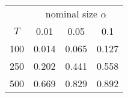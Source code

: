 % 
\begin{tabular}{cccc}
  \hline
  & \multicolumn{3}{c}{nominal size $\alpha$} \\
 $T$ & 0.01 & 0.05 & 0.1 \\
 \hline
100 & 0.014 & 0.065 & 0.127 \\ 
  250 & 0.202 & 0.441 & 0.558 \\ 
  500 & 0.669 & 0.829 & 0.892 \\ 
   \hline
\end{tabular}
